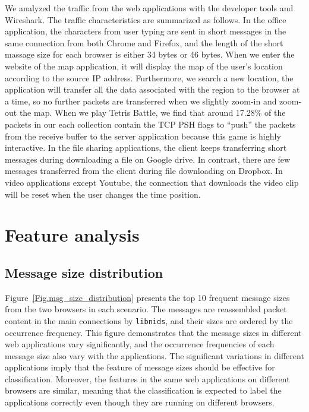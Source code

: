 We analyzed the traffic from the web applications with the developer tools and Wireshark. The traffic characteristics are summarized as follows. In the office application, the characters from user typing are sent in short messages in the same connection from both Chrome and Firefox, and the length of the short massage size for each browser is either 34 bytes or 46 bytes. When we enter the website of the map application, it will display the map of the user's location according to the source IP address. Furthermore, we search a new location, the application will transfer all the data associated with the region to the browser at a time, so no further packets are transferred when we slightly zoom-in and zoom-out the map. When we play Tetris Battle, we find that around 17.28\% of the packets in our each collection contain the TCP PSH flags to ``push'' the packets from the receive buffer to the server application because this game is highly interactive. In the file sharing applications, the client keeps transferring short messages during downloading a file on Google drive. In contrast, there are few messages transferred from the client during file downloading on Dropbox. In video applications except Youtube, the connection that downloads the video clip will be reset when the user changes the time position. 


\section{Feature analysis}
\label{sec:feature analysis}
\subsection{Message size distribution}
Figure~\ref{Fig.msg_size_distribution} presents the top 10 frequent message sizes from the two browsers in each scenario. The messages are reassembled packet content in the main connections by \texttt{libnids}, and their sizes are ordered by the occurrence frequency. This figure demonstrates that the message sizes in different web applications vary significantly, and the occurrence frequencies of each message size also vary with the applications. The significant variations in different applications imply that the feature of message sizes should be effective for classification. Moreover, the features in the same web applications on different browsers are similar, meaning that the classification is expected to label the applications correctly even though they are running on different browsers.  

